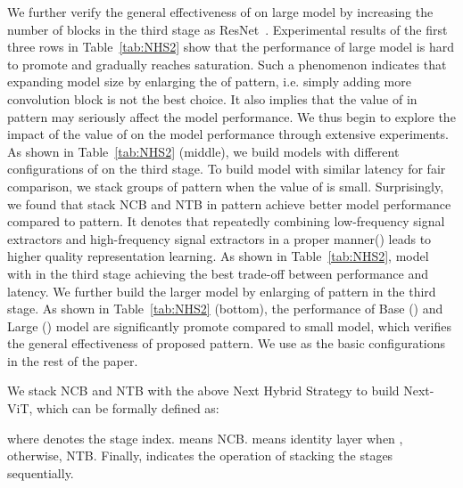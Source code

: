 \documentclass[10pt,twocolumn,letterpaper]{article}
\begin{document}
We further verify the general effectiveness of  on large model by increasing the number of blocks in the third stage as ResNet~\cite{ResNet}. Experimental results of the first three rows in Table~\ref{tab:NHS2} show that the performance of large model is hard to promote and gradually reaches saturation.
Such a phenomenon indicates that expanding model size by enlarging the  of  pattern, i.e. simply adding more convolution block is not the best choice. It also implies that the value of  in  pattern may seriously affect the model performance.
We thus begin to explore the impact of the value of  on the model performance through extensive experiments. As shown in Table~\ref{tab:NHS2} (middle), we build models with different configurations of  on the third stage. To build model with similar latency for fair comparison, we stack  groups of  pattern when the value of  is small. 
Surprisingly, we found that stack NCB and NTB in  pattern achieve better model performance compared to  pattern.
It denotes that repeatedly combining low-frequency signal extractors and high-frequency signal extractors in a proper manner() leads to higher quality representation learning.  As shown in Table~\ref{tab:NHS2}, model with  in the third stage achieving the best trade-off between performance and latency.
We further build the larger model by enlarging  of   pattern in the third stage. 
As shown in Table~\ref{tab:NHS2} (bottom), the performance of Base () and Large () model are significantly promote compared to small model, which verifies the general effectiveness of proposed  pattern. We use  as the basic configurations in the rest of the paper.


We stack NCB and NTB with the above Next Hybrid Strategy to build Next-ViT, which can be formally defined as:

where  denotes the stage index.  means NCB.  means identity layer when , otherwise, NTB. Finally,  indicates the operation of stacking the stages sequentially.
\end{document}
